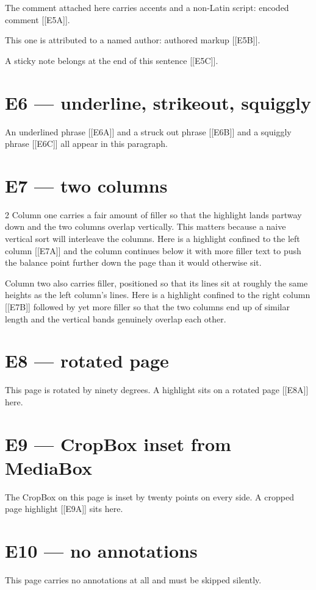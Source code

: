 \documentclass[11pt,a4paper]{article}
\begin{document}
The comment attached here carries accents and a non-Latin script:
encoded comment [[E5A]].

This one is attributed to a named author: authored markup [[E5B]].

A sticky note belongs at the end of this sentence [[E5C]].

\section*{E6 --- underline, strikeout, squiggly}

An underlined phrase [[E6A]] and a struck out phrase [[E6B]] and a
squiggly phrase [[E6C]] all appear in this paragraph.

\section*{E7 --- two columns}

\begin{multicols}{2}
Column one carries a fair amount of filler so that the highlight lands
partway down and the two columns overlap vertically. This matters
because a naive vertical sort will interleave the columns. Here is a
highlight confined to the left column [[E7A]] and the column continues
below it with more filler text to push the balance point further down
the page than it would otherwise sit.

\columnbreak

Column two also carries filler, positioned so that its lines sit at
roughly the same heights as the left column's lines. Here is a
highlight confined to the right column [[E7B]] followed by yet more
filler so that the two columns end up of similar length and the
vertical bands genuinely overlap each other.
\end{multicols}

\clearpage
{}
\section*{E8 --- rotated page}

This page is rotated by ninety degrees. A highlight sits on a rotated
page [[E8A]] here.

\clearpage
{}
\section*{E9 --- CropBox inset from MediaBox}

The CropBox on this page is inset by twenty points on every side. A
cropped page highlight [[E9A]] sits here.

\clearpage
\pdfpageattr{}
\section*{E10 --- no annotations}

This page carries no annotations at all and must be skipped silently.
\end{document}

